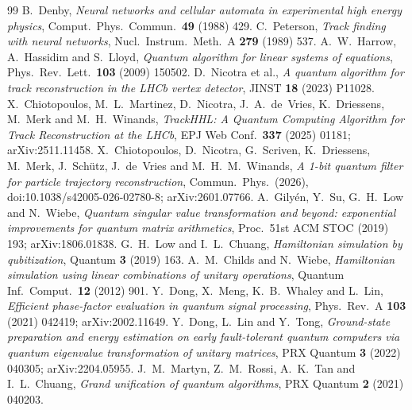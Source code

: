 \documentclass[11pt,a4paper]{article}
\begin{document}
\begin{thebibliography}{99}
 B.~Denby, \emph{Neural networks and cellular automata in experimental high energy physics}, Comput.\ Phys.\ Commun.\ \textbf{49} (1988) 429.
 C.~Peterson, \emph{Track finding with neural networks}, Nucl.\ Instrum.\ Meth.\ A \textbf{279} (1989) 537.
 A.~W.~Harrow, A.~Hassidim and S.~Lloyd, \emph{Quantum algorithm for linear systems of equations}, Phys.\ Rev.\ Lett.\ \textbf{103} (2009) 150502.
 D.~Nicotra et al., \emph{A quantum algorithm for track reconstruction in the LHCb vertex detector}, JINST \textbf{18} (2023) P11028.
 X.~Chiotopoulos, M.~L.~Martinez, D.~Nicotra, J.~A.~de~Vries, K.~Driessens, M.~Merk and M.~H.~Winands, \emph{TrackHHL: A Quantum Computing Algorithm for Track Reconstruction at the LHCb}, EPJ Web Conf.\ \textbf{337} (2025) 01181; arXiv:2511.11458.
 X.~Chiotopoulos, D.~Nicotra, G.~Scriven, K.~Driessens, M.~Merk, J.~Sch\"utz, J.~de~Vries and M.~H.~M.~Winands, \emph{A 1-bit quantum filter for particle trajectory reconstruction}, Commun.\ Phys.\ (2026), doi:10.1038/s42005-026-02780-8; arXiv:2601.07766.
 A.~Gily\'en, Y.~Su, G.~H.~Low and N.~Wiebe, \emph{Quantum singular value transformation and beyond: exponential improvements for quantum matrix arithmetics}, Proc.\ 51st ACM STOC (2019) 193; arXiv:1806.01838.
 G.~H.~Low and I.~L.~Chuang, \emph{Hamiltonian simulation by qubitization}, Quantum \textbf{3} (2019) 163.
 A.~M.~Childs and N.~Wiebe, \emph{Hamiltonian simulation using linear combinations of unitary operations}, Quantum Inf.\ Comput.\ \textbf{12} (2012) 901.
 Y.~Dong, X.~Meng, K.~B.~Whaley and L.~Lin, \emph{Efficient phase-factor evaluation in quantum signal processing}, Phys.\ Rev.\ A \textbf{103} (2021) 042419; arXiv:2002.11649.
 Y.~Dong, L.~Lin and Y.~Tong, \emph{Ground-state preparation and energy estimation on early fault-tolerant quantum computers via quantum eigenvalue transformation of unitary matrices}, PRX Quantum \textbf{3} (2022) 040305; arXiv:2204.05955.
 J.~M.~Martyn, Z.~M.~Rossi, A.~K.~Tan and I.~L.~Chuang, \emph{Grand unification of quantum algorithms}, PRX Quantum \textbf{2} (2021) 040203.
\end{thebibliography}
\end{document}
